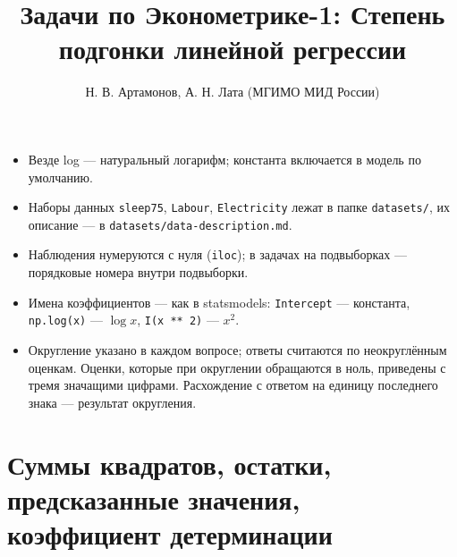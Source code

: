 \documentclass[
  russian,
]{article}
\title{Задачи по Эконометрике-1: Степень подгонки линейной регрессии}
\author{Н. В. Артамонов, А. Н. Лата (МГИМО МИД России)}
\date{}
\providecommand{\tightlist}{%
  \setlength{\itemsep}{0pt}\setlength{\parskip}{0pt}}
\renewcommand*\contentsname{Содержание}
\newcommand\contentsname{Содержание}
\begin{document}
\maketitle

\renewcommand*\contentsname{Содержание}
{
\setcounter{tocdepth}{3}
\tableofcontents
}

\begin{tcolorbox}[enhanced jigsaw, arc=.35mm, bottomrule=.15mm, bottomtitle=1mm, breakable, colback=white, colbacktitle=quarto-callout-important-color!10!white, colframe=quarto-callout-important-color-frame, coltitle=black, left=2mm, leftrule=.75mm, opacityback=0, opacitybacktitle=0.6, rightrule=.15mm, title=\textcolor{quarto-callout-important-color}{\faExclamation}\hspace{0.5em}{Важно}, titlerule=0mm, toprule=.15mm, toptitle=1mm]

\begin{itemize}
\tightlist
\item
  Везде log --- натуральный логарифм; константа включается в модель по
  умолчанию.
\item
  Наборы данных \texttt{sleep75}, \texttt{Labour}, \texttt{Electricity}
  лежат в папке \texttt{datasets/}, их описание --- в
  \texttt{datasets/data-description.md}.
\item
  Наблюдения нумеруются с нуля (\texttt{iloc}); в задачах на подвыборках
  --- порядковые номера внутри подвыборки.
\item
  Имена коэффициентов --- как в statsmodels: \texttt{Intercept} ---
  константа, \texttt{np.log(x)} --- \(\log x\), \texttt{I(x\ **\ 2)} ---
  \(x^2\).
\item
  Округление указано в каждом вопросе; ответы считаются по неокруглённым
  оценкам. Оценки, которые при округлении обращаются в ноль, приведены с
  тремя значащими цифрами. Расхождение с ответом на единицу последнего
  знака --- результат округления.
\end{itemize}

\end{tcolorbox}

\section{Суммы квадратов, остатки, предсказанные значения, коэффициент
детерминации}\label{ux441ux443ux43cux43cux44b-ux43aux432ux430ux434ux440ux430ux442ux43eux432-ux43eux441ux442ux430ux442ux43aux438-ux43fux440ux435ux434ux441ux43aux430ux437ux430ux43dux43dux44bux435-ux437ux43dux430ux447ux435ux43dux438ux44f-ux43aux43eux44dux444ux444ux438ux446ux438ux435ux43dux442-ux434ux435ux442ux435ux440ux43cux438ux43dux430ux446ux438ux438}
\end{document}
